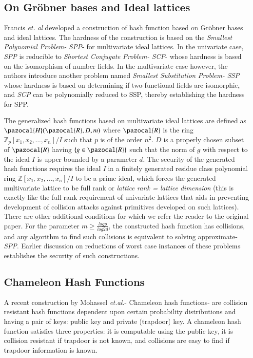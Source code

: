 \documentclass[10pt]{elsarticle}
\begin{document}
\subsection{On Gr\"{o}bner bases and Ideal lattices}

Francis \textit{et. al} \cite{CRHF_Francis2018} developed a construction of hash function based on Gr\"{o}bner bases and ideal lattices. The hardness of the construction is based on the \textit{Smallest Polynomial Problem- SPP}- for multivariate ideal lattices. In the univariate case, \textit{SPP} is reducible to \textit{Shortest Conjugate Problem- SCP}- whose hardness is based on the isomorphism of number fields. In the multivariate case however, the authors introduce another problem named \textit{Smallest Substitution Problem- SSP} whose hardness is based on determining if two functional fields are isomorphic, and \textit{SCP} can be polynomially reduced to SSP, thereby establishing the hardness for SPP.

The generalized hash functions based on multivariate ideal lattices are defined as $\pazocal{H}(\pazocal{R}, D, m)$ where $\pazocal{R}$ is the ring $\mathbb{Z}_{p}[x_{1}, x_{2}, ..., x_{n}]/I$ such that $p$ is of the order $n^{2}$. $D$ is a properly chosen subset of $\pazocal{R}$ having $\{g \in \pazocal{R}\}$ such that the norm of $g$ with respect to the ideal $I$ is upper bounded by a parameter $d$. The security of the generated hash functions requires the ideal \textit{I} in a finitely generated residue class polynomial ring $\mathbb{Z}[x_{1}, x_{2}, ..., x_{n}]/I$ to be a prime ideal, which forces the generated multivariate lattice to be full rank or \textit{lattice rank = lattice dimension} (this is exactly like the full rank requirement of univariate lattices that aids in preventing development of collision attacks against primitives developed on such lattices). There are other additional conditions for which we refer the reader to the original paper. For the parameter $m \geq \frac{log p}{log 2d}$, the constructed hash function has collisions, and any algorithm to find such collisions is equivalent to solving approximate-\textit{SPP}. Earlier discussion on reductions of worst case instances of these problems establishes the security of such constructions.


\subsection{Chameleon Hash Functions}

A recent construction by Mohassel \textit{et.al.}\cite{CRHF_Mohassel2011}- Chameleon hash functions- are collision resistant hash functions dependent upon certain probability distributions and having a pair of keys: public key and private (trapdoor) key. A chameleon hash function satisfies three properties: it is computable using the public key, it is collision resistant if trapdoor is not known, and collisions are easy to find if trapdoor information is known.
\end{document}
